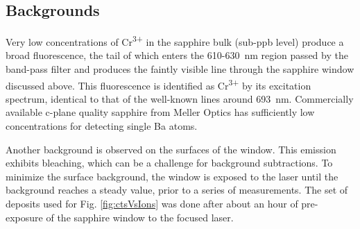 \documentclass[aps,pra,reprint,superscriptaddress]{revtex4-1}
\begin{document}



\subsection{Backgrounds}
\label{sec:backgrounds}

Very low concentrations of Cr\textsuperscript{3+} in the sapphire bulk (sub-ppb level) produce a broad fluorescence, the tail of which enters the 610-630~nm region passed by the band-pass filter and produces the faintly visible line through the sapphire window discussed above.  This fluorescence is identified as Cr\textsuperscript{3+} by its excitation spectrum, identical to that of the well-known lines around 693~nm.  Commercially available c-plane quality sapphire from Meller Optics has sufficiently low concentrations for detecting single Ba atoms.

Another background is observed on the surfaces of the window.  This emission exhibits bleaching, which can be a challenge for background subtractions.  To minimize the surface background, the window is exposed to the laser until the background reaches a steady value, prior to a series of measurements.  The set of deposits used for Fig. \ref{fig:ctsVsIons} was done after about an hour of pre-exposure of the sapphire window to the focused laser.
\end{document}
